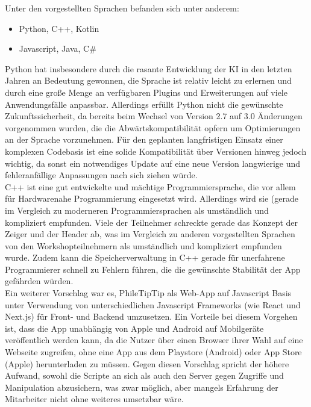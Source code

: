Unter den vorgestellten Sprachen befanden sich unter anderem:

\begin{itemize}
  \item Python, C++, Kotlin
  \item Javascript, Java, {C\#}
\end{itemize}

Python hat insbesondere durch die rasante Entwicklung der KI in den letzten Jahren an Bedeutung gewonnen, die Sprache ist relativ leicht zu erlernen und durch eine große Menge an verfügbaren Plugins und Erweiterungen auf viele Anwendungsfälle anpassbar. Allerdings erfüllt Python nicht die gewünschte Zukunftssicherheit, da bereits beim Wechsel von Version 2.7 auf 3.0 Änderungen vorgenommen wurden, die die Abwärtskompatibilität opfern um Optimierungen an der Sprache vorzunehmen. Für den geplanten langfristigen Einsatz einer komplexen Codebasis ist eine solide Kompatibilität über Versionen hinweg jedoch wichtig, da sonst ein notwendiges Update auf eine neue Version langwierige und fehleranfällige Anpassungen nach sich ziehen würde.\\

C++ ist eine gut entwickelte und mächtige Programmiersprache, die vor allem für Hardwarenahe Programmierung eingesetzt wird. Allerdings wird sie (gerade im Vergleich zu moderneren Programmiersprachen als umständlich und kompliziert empfunden. Viele der Teilnehmer schreckte gerade das Konzept der Zeiger und der Header ab, was im Vergleich zu anderen vorgestellten Sprachen von den Workshopteilnehmern als umständlich und kompliziert empfunden wurde. Zudem kann die Speicherverwaltung in C++ gerade für unerfahrene Programmierer schnell zu Fehlern führen, die die gewünschte Stabilität der App gefährden würden.\\

Ein weiterer Vorschlag war es, PhileTipTip als Web-App auf Javascript Basis unter Verwendung von unterschiedlichen Javascript Frameworks (wie React und Next.js) für Front- und Backend umzusetzen. Ein Vorteile bei diesem Vorgehen ist, dass die App unabhängig von Apple und Android auf Mobilgeräte veröffentlich werden kann, da die Nutzer über einen Browser ihrer Wahl auf eine Webseite zugreifen, ohne eine App aus dem Playstore (Android) oder App Store (Apple) herunterladen zu müssen. Gegen diesen Vorschlag spricht der höhere Aufwand, sowohl die Scripte an sich als auch den Server gegen Zugriffe und Manipulation abzusichern, was zwar möglich, aber mangels Erfahrung der Mitarbeiter nicht ohne weiteres umsetzbar wäre.\\

